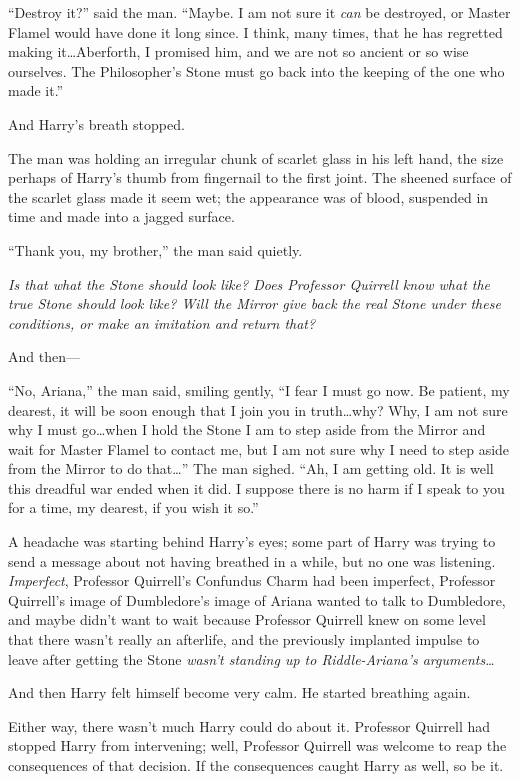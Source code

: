 “Destroy it?” said the man. “Maybe. I am not sure it \emph{can} be destroyed,
or Master Flamel would have done it long since. I think, many times, that he
has regretted making it…Aberforth, I promised him, and we are not so
ancient or so wise ourselves. The Philosopher’s Stone must go back into the
keeping of the one who made it.”

And Harry’s breath stopped.

The man was holding an irregular chunk of scarlet glass in his left hand, the
size perhaps of Harry’s thumb from fingernail to the first joint. The sheened
surface of the scarlet glass made it seem wet; the appearance was of blood,
suspended in time and made into a jagged surface.

“Thank you, my brother,” the man said quietly.

\emph{Is that what the Stone should look like? Does Professor Quirrell know
what the true Stone should look like? Will the Mirror give back the real Stone
under these conditions, or make an imitation and return that?}

And then—

“No, Ariana,” the man said, smiling gently, “I fear I must go now. Be patient,
my dearest, it will be soon enough that I join you in truth…why? Why, I
am not sure why I must go…when I hold the Stone I am to step aside from
the Mirror and wait for Master Flamel to contact me, but I am not sure why I
need to step aside from the Mirror to do that…” The man sighed. “Ah, I
am getting old. It is well this dreadful war ended when it did. I suppose there
is no harm if I speak to you for a time, my dearest, if you wish it so.”

A headache was starting behind Harry’s eyes; some part of Harry was trying to
send a message about not having breathed in a while, but no one was listening.
\emph{Imperfect}, Professor Quirrell’s Confundus Charm had been imperfect,
Professor Quirrell’s image of Dumbledore’s image of Ariana wanted to talk to
Dumbledore, and maybe didn’t want to wait because Professor Quirrell knew on
some level that there wasn’t really an afterlife, and the previously implanted
impulse to leave after getting the Stone \emph{wasn’t standing up to
Riddle-Ariana’s arguments…}

And then Harry felt himself become very calm. He started breathing again.

Either way, there wasn’t much Harry could do about it. Professor Quirrell had
stopped Harry from intervening; well, Professor Quirrell was welcome to reap
the consequences of that decision. If the consequences caught Harry as well, so
be it.

